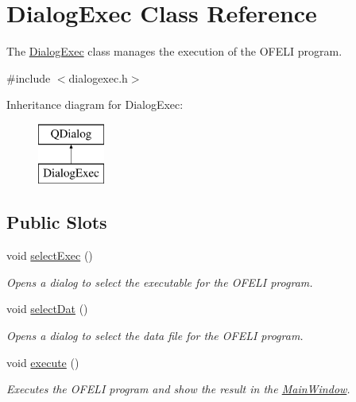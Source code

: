 \hypertarget{classDialogExec}{\section{Dialog\-Exec Class Reference}
\label{classDialogExec}
}


The \hyperlink{classDialogExec}{Dialog\-Exec} class manages the execution of the O\-F\-E\-L\-I program.  




{\ttfamily \#include $<$dialogexec.\-h$>$}

Inheritance diagram for Dialog\-Exec\-:\begin{figure}[H]
\begin{center}
\leavevmode
\includegraphics[height=2.000000cm]{classDialogExec}
\end{center}
\end{figure}
\subsection*{Public Slots}
\begin{DoxyCompactItemize}
\item 
\hypertarget{classDialogExec_ab33c3a148cfaa7d2969b9c42b4f97911}{void \hyperlink{classDialogExec_ab33c3a148cfaa7d2969b9c42b4f97911}{select\-Exec} ()}\label{classDialogExec_ab33c3a148cfaa7d2969b9c42b4f97911}

\begin{DoxyCompactList}\small\item\em Opens a dialog to select the executable for the O\-F\-E\-L\-I program. \end{DoxyCompactList}\item 
\hypertarget{classDialogExec_a8368adc07cebb25e0d78c137ee6149e9}{void \hyperlink{classDialogExec_a8368adc07cebb25e0d78c137ee6149e9}{select\-Dat} ()}\label{classDialogExec_a8368adc07cebb25e0d78c137ee6149e9}

\begin{DoxyCompactList}\small\item\em Opens a dialog to select the data file for the O\-F\-E\-L\-I program. \end{DoxyCompactList}\item 
\hypertarget{classDialogExec_a0911fce2350ffef1f3b72cabf1ca7796}{void \hyperlink{classDialogExec_a0911fce2350ffef1f3b72cabf1ca7796}{execute} ()}\label{classDialogExec_a0911fce2350ffef1f3b72cabf1ca7796}

\begin{DoxyCompactList}\small\item\em Executes the O\-F\-E\-L\-I program and show the result in the \hyperlink{classMainWindow}{Main\-Window}. \end{DoxyCompactList}\end{DoxyCompactItemize}
